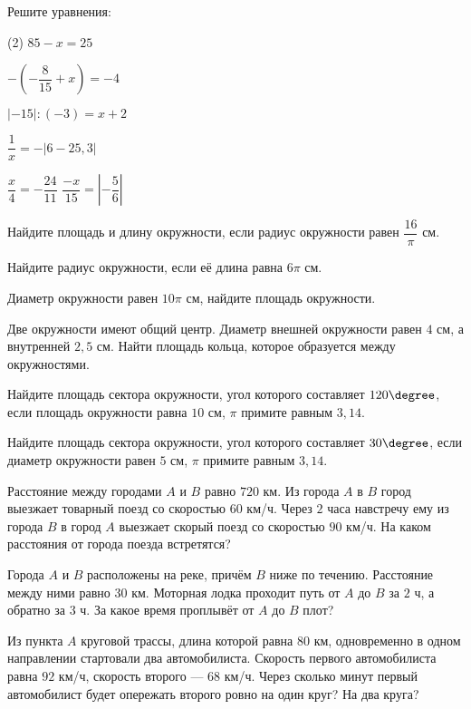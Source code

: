 \begin{class}[number=6]
	\begin{listofex}
		\item Решите уравнения:
		\begin{tasks}(2)
			\task \( 85-x=25 \)
			
			\task \( -\left( -\dfrac{8}{15} + x \right) = -4 \)
			
			\task \( |-15|:(-3)=x+2 \)
			
			\task \( \dfrac{1}{x} = -|6-25,3| \)
			
			\task \( \dfrac{x}{4} = -\dfrac{24}{11} \)
			\task \( \dfrac{-x}{15} = \left| -\dfrac{5}{6} \right| \)
		\end{tasks}
		\item Найдите площадь и длину окружности, если радиус окружности равен \( \dfrac{16}{\pi} \) см.
		\item Найдите радиус окружности, если её длина равна \( 6\pi \) см.
		\item Диаметр окружности равен \(10\pi\) см, найдите площадь окружности.
		\item Две окружности имеют общий центр. Диаметр внешней окружности равен \(4\) см, а внутренней \(2,5\) см. Найти площадь кольца, которое образуется между окружностями.
		\item Найдите площадь сектора окружности, угол которого составляет \(120 \degree\), если площадь окружности равна \( 10 \) см, \(\pi\) примите равным \(3,14\).
		\item Найдите площадь сектора окружности, угол которого составляет \(30 \degree\), если диаметр окружности равен \( 5 \) см, \(\pi\) примите равным \(3,14\).
		\item Расстояние между городами \(A\) и \(B\) равно \(720\) км. Из города \(A\) в \(B\) город выезжает товарный поезд со скоростью \(60\) км/ч. Через \(2\) часа навстречу ему из города \(B\) в город \(A\) выезжает скорый поезд со скоростью \(90\) км/ч. На каком расстояния от города поезда встретятся?
		
		
		 \item Города \(A\) и \(B\) расположены на реке, причём \(B\) ниже по течению. Расстояние между ними равно \(30\) км. Моторная лодка проходит путь от \(A\) до \(B\) за \(2\) ч, а обратно за \(3\) ч. За какое время проплывёт от \(A\) до \(B\) плот?
		\item Из пункта \(A\) круговой трассы, длина которой равна \(80\) км, одновременно в одном направлении стартовали два автомобилиста. Скорость первого автомобилиста равна \(92\) км/ч, скорость второго --- \(68\) км/ч. Через сколько минут первый автомобилист будет опережать второго ровно на один круг? На два круга?
	\end{listofex}
\end{class}

